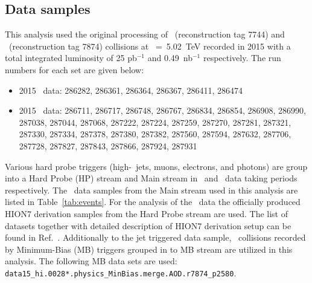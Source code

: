 
\subsection{Data samples}

This analysis used the original processing of \pp\ (reconstruction tag 7744) and \PbPb\ (reconstruction tag 7874) collisions at \sqrtsnn~=~5.02~TeV recorded in 2015 with a total integrated luminosity of 25 pb$^{-1}$ and 0.49~nb$^{-1}$ respectively. The run numbers for each set are given below:
\begin{itemize}
\item 2015 \pp\ data: 286282, 286361, 286364, 286367, 286411, 286474
\item 2015 \PbPb\ data: 286711, 286717, 286748, 286767, 286834, 286854, 286908, 286990, 287038, 287044, 287068, 287222, 287224, 287259, 287270, 287281, 287321, 287330, 287334, 287378, 287380, 287382, 287560, 287594, 287632, 287706, 287728, 287827, 287843, 287866, 287924, 287931
\end{itemize}


Various hard probe triggers (high-\pT\ jets, muons, electrons, and photons) are group into a Hard Probe (HP) stream and Main stream in \PbPb\ and \pp\ data taking periods respectively. The \pp\ data samples from the Main stream used in this analysis are listed in Table~\ref{tab:events}. For the analysis of the \pbpb\ data the officially produced HION7 derivation samples from the Hard Probe stream are used. The list of datasets together with detailed description of HION7 derivation setup can be found in Ref.~\cite{HIdataderviation}. Additionally to the jet triggered data sample, \PbPb\ collisions recorded by Minimum-Bias (MB) triggers grouped in to MB stream are utilized in this analysis. The following MB data sets are used: \texttt{data15\_hi.0028*.physics\_MinBias.merge.AOD.r7874\_p2580}.



